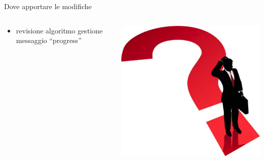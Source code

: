 \begin{frame}{Dove apportare le modifiche}
{\begin{columns}
\begin{column}{0.7\textwidth}
\begin{itemize}
\begin{itemize}
						\item{\scriptsize{percentuale strada percorsa}}
						\item{\scriptsize{evento pianificato}}
					\end{itemize}
					\item{\scriptsize{revisione algoritmo gestione messaggio ``progress''}}
				\end{itemize}
			\end{column}
			\begin{column}{0.3\textwidth}
				\centering
				\includegraphics[scale=0.15]{images/need.png}
			\end{column}
		\end{columns}
	}
\end{frame}

